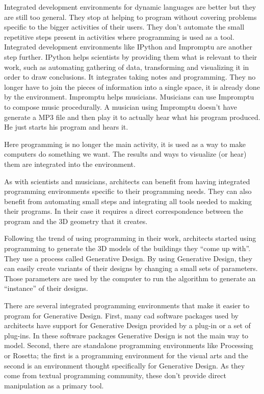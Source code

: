 \documentclass{./llncs2e/llncs}
\begin{document}
	Integrated development environments for dynamic languages are better but they are still too general.
	They stop at helping to program without covering problems specific to the bigger activities of their users.
	They don't automate the small repetitive steps present in activities where programming is used as a tool.
	Integrated development environments like IPython and Impromptu are another step further.
	IPython helps scientists by providing them what is relevant to their work, such as automating gathering of data, transforming and visualizing it in order to draw conclusions.
	It integrates taking notes and programming.
	They no longer have to join the pieces of information into a single space, it is already done by the environment.
	Impromptu helps musicians.
	Musicians can use Impromptu to compose music procedurally.
	A musician using Impromptu doesn't have generate a MP3 file and then play it to actually hear what his program produced.
	He just starts his program and hears it.

	Here programming is no longer the main activity, it is used as a way to make computers do something we want.
	The results and ways to visualize (or hear) them are integrated into the environment.

	As with scientists and musicians, architects can benefit from having integrated programming environments specific to their programming needs.
	They can also benefit from automating small steps and integrating all tools needed to making their programs.
	In their case it requires a direct correspondence between the program and the 3D geometry that it creates.
	
	Following the trend of using programming in their work, architects started using programming to generate the 3D models of the buildings they ``come up with''. 
	They use a process called Generative Design\cite{terzidis2003expressive}\cite{Maeda:2001:DN:559503}.
	By using Generative Design, they can easily create variants of their designs by changing a small sets of parameters. 
	Those parameters are used by the computer to run the algorithm to generate an ``instance'' of their designs. \cite{Santos20144}

	There are several integrated programming environments that make it easier to program for Generative Design. 
	First, many \ac{cad} software packages used by architects have support for Generative Design provided by a plug-in or a set of plug-ins.
	In these software packages Generative Design is not the main way to model.
	Second, there are standalone programming environments like Processing\cite{reas2007processing} or Rosetta\cite{de2012modern}; the first is a programming environment for the visual arts and the second is an environment thought specifically for Generative Design. 
	As they come from textual programming community, these don't provide direct manipulation as a primary tool.
\end{document}
